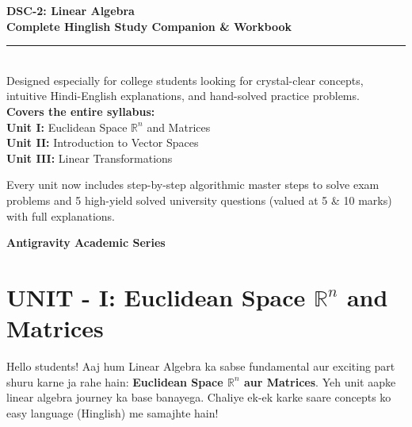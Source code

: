 \documentclass[11pt,a4paper]{article}
\begin{document}
\begin{center}
    \vspace*{1.5cm}
    {\Huge\bfseries\color{RoyalBlue} DSC-2: Linear Algebra}\\[0.4cm]
    {\Large\bfseries\color{Eggplant} Complete Hinglish Study Companion \& Workbook}\\[0.6cm]
    \rule{\linewidth}{1.5pt}\\[1.0cm]
    
    {\large Designed especially for college students looking for crystal-clear concepts, \\
    intuitive Hindi-English explanations, and hand-solved practice problems.}\\[1.5cm]
    
    \textbf{Covers the entire syllabus:}\\
    \textbf{Unit I:} Euclidean Space $\mathbb{R}^n$ and Matrices\\
    \textbf{Unit II:} Introduction to Vector Spaces\\
    \textbf{Unit III:} Linear Transformations\\[1.5cm]
    
    \begin{tcolorbox}[colback=RoyalBlue!5!white, colframe=RoyalBlue, width=0.85\textwidth, arc=2mm, title=\textbf{NEW FEATURE: Master Solving Guides \& 15 Exam PYQs}, coltitle=white, fonttitle=\sffamily\bfseries\small, center]
        Every unit now includes step-by-step algorithmic master steps to solve exam problems and 5 high-yield solved university questions (valued at 5 \& 10 marks) with full explanations.
    \end{tcolorbox}
    
    \vfill
    {\large\bfseries\color{DarkSlate} Antigravity Academic Series}
\end{center}
\newpage

\tableofcontents
\newpage

\section{UNIT - I: Euclidean Space $\mathbb{R}^n$ and Matrices}

Hello students! Aaj hum Linear Algebra ka sabse fundamental aur exciting part shuru karne ja rahe hain: \textbf{Euclidean Space $\mathbb{R}^n$ aur Matrices}. Yeh unit aapke linear algebra journey ka base banayega. Chaliye ek-ek karke saare concepts ko easy language (Hinglish) me samajhte hain!
\end{document}
